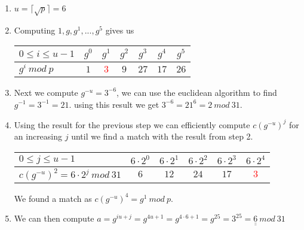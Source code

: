 \begin{enumerate}
\item $u = \lceil \sqrt{p} \rceil = 6$
\item Computing $1,g,g^1,...,g^5$ gives us  \\

\begin{tabular}{|l|c|c|c|c|c|c|}
    \hline  
    $0 \leq i \leq u-1$             &   $g^0$   &   $g^1$     &   $g^2$     &   $g^3$     &   $g^4$     &   $g^5$     \\
    \hline  
    $g^i \ mod \ p$ &   $1$       &   \textcolor{red}{$3$}       &   $9$       &   $27$      &   $17$      &   $26$      \\
    \hline 
\end{tabular}

\item Next we compute $g^{-u} = 3^{-6}$, we can use the euclidean algorithm to find $g^{-1} = 3^{-1} = 21$. using this result we get $3^{-6} = 21^6 = 2 \ mod \ 31$. 

\item Using the result for the previous step we can efficiently compute $c(g^{-u})^j$ for an increasing $j$ until we find a match with the result from step 2. \\

\iffalse
\begin{align*}
    c(g^{-u})^0 &= 6 \cdot 2^0 = 6 \\
    c(g^{-u})^1 &= 6 \cdot 2^1 = 12 \\
    c(g^{-u})^2 &= 6 \cdot 2^2 = 24 \\
    c(g^{-u})^3 &= 6 \cdot 2^3 = 17 \ mod \ 31 \\
    c(g^{-u})^4 &= 6 \cdot 2^4 = 3 \ mod \ 13
\end{align*}
\fi 

\begin{tabular}{|l|c|c|c|c|c|}
    \hline  
    $0 \leq j \leq u-1$    &   $6 \cdot 2^0$   &   $6 \cdot 2^1$     &   $6 \cdot 2^2$     &   $6 \cdot 2^3$     &   $6 \cdot 2^4$        \\
    \hline  
    $c(g^{-u})^2 = 6 \cdot 2^j \ mod \ 31$ &   $6$   &   $12$   &   $24$   &   $17$      &   \textcolor{red}{$3$}       \\
    \hline 
\end{tabular}

We found a match as $c(g^{-u})^4 = g^1 \ mod \ p$. 
\item We can then compute $a = g^{iu+j} = g^{4u+1} = g^{4 \cdot 6 + 1} = g^{25} = 3^{25} = \underline{\underline{6}} \ mod \ 31$
\end{enumerate}



